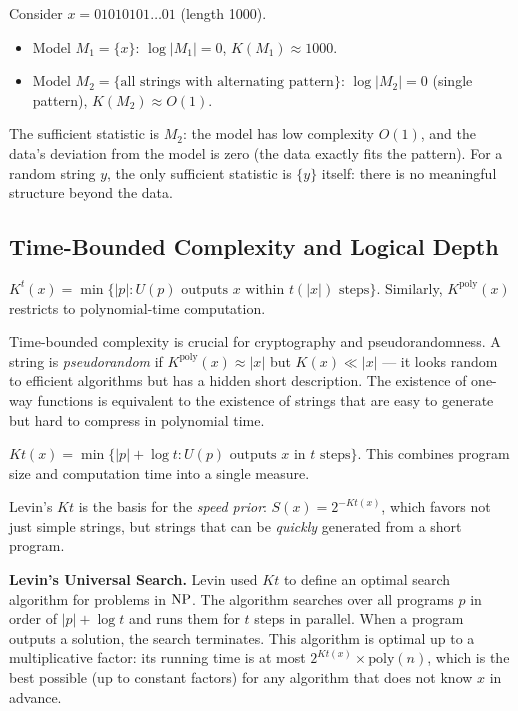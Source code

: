 \begin{example}
Consider $x = 01010101\ldots01$ (length 1000). 
\begin{itemize}
\item Model $M_1 = \{x\}$: $\log |M_1| = 0$, $K(M_1) \approx 1000$.
\item Model $M_2 = \{\text{all strings with alternating pattern}\}$: $\log |M_2| = 0$ (single pattern), $K(M_2) \approx O(1)$.
\end{itemize}
The sufficient statistic is $M_2$: the model has low complexity $O(1)$, and the data's deviation from the model is zero (the data exactly fits the pattern). For a random string $y$, the only sufficient statistic is $\{y\}$ itself: there is no meaningful structure beyond the data.
\end{example}

\subsection{Time-Bounded Complexity and Logical Depth}
\label{sec:kolmogorov:time}

\begin{definition}
$K^t(x) = \min \{ |p| : U(p) \text{ outputs } x \text{ within } t(|x|) \text{ steps} \}$.
Similarly, $K^{\text{poly}}(x)$ restricts to polynomial-time computation.
\end{definition}

Time-bounded complexity is crucial for cryptography and pseudorandomness. A string is \emph{pseudorandom} if $K^{\text{poly}}(x) \approx |x|$ but $K(x) \ll |x|$ --- it looks random to efficient algorithms but has a hidden short description. The existence of one-way functions is equivalent to the existence of strings that are easy to generate but hard to compress in polynomial time.

\begin{definition}
$Kt(x) = \min \{ |p| + \log t : U(p) \text{ outputs } x \text{ in } t \text{ steps} \}$.
This combines program size and computation time into a single measure.
\end{definition}

Levin's $Kt$ is the basis for the \emph{speed prior}: $S(x) = 2^{-Kt(x)}$, which favors not just simple strings, but strings that can be \emph{quickly} generated from a short program.

\textbf{Levin's Universal Search.} Levin used $Kt$ to define an optimal search algorithm for problems in $\text{NP}$. The algorithm searches over all programs $p$ in order of $|p| + \log t$ and runs them for $t$ steps in parallel. When a program outputs a solution, the search terminates. This algorithm is optimal up to a multiplicative factor: its running time is at most $2^{Kt(x)} \times \text{poly}(n)$, which is the best possible (up to constant factors) for any algorithm that does not know $x$ in advance.

